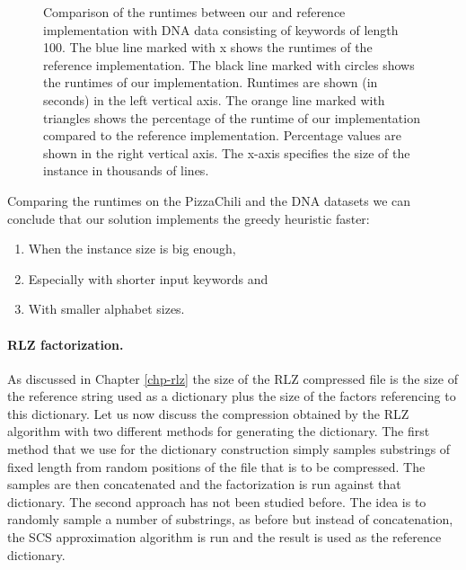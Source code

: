 \documentclass[english,twoside,censored,csm,algorithms-track-2020]{HYthesisML}
\theoremstyle{plain}
\theoremstyle{definition}
\begin{document}
\begin{figure}[t]
\caption{Comparison of the runtimes between our and reference implementation with DNA data consisting
  of keywords of length 100. The blue line marked with x shows the runtimes of the reference
  implementation. The black line marked with circles shows the runtimes of our implementation. Runtimes are
  shown (in seconds) in the left vertical axis. The orange line marked with triangles shows the percentage
  of the runtime of our implementation compared to the reference implementation. Percentage values
  are shown in the right vertical axis. The x-axis specifies the size of the instance in thousands
  of lines. }
  \label{fig-dna}
\end{figure}

\vspace{1cm}
  Comparing the runtimes on the PizzaChili and the DNA datasets we can conclude that
  our solution implements the greedy heuristic faster:

  \begin{enumerate}
  \item When the instance size is big enough,
  \item Especially with shorter input keywords and
  \item With smaller alphabet sizes.
  \end{enumerate}

\paragraph{RLZ factorization.}
As discussed in Chapter \ref{chp-rlz} the size of the RLZ compressed file is the size of the reference
string used as a dictionary plus the size of the factors referencing to this dictionary. Let us now
discuss the compression obtained by the RLZ algorithm with two different methods for generating the dictionary.
The first method that we use for the dictionary construction simply samples substrings of
fixed length from random positions of the file that is to be compressed.
The samples are then concatenated and the
factorization is run against that dictionary. The second approach has not been studied before. The
idea is to randomly sample a number of substrings, as before but instead of
concatenation, the SCS approximation algorithm is run and the result is used as the reference
dictionary.
\end{document}
